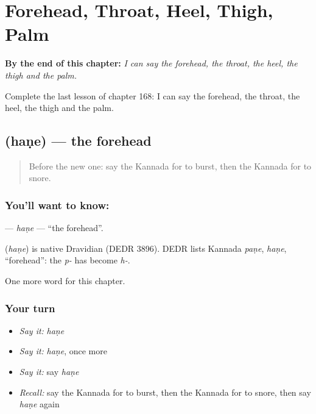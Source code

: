 
\chapter{Forehead, Throat, Heel, Thigh, Palm}
\label{ch:ka-forehead-throat-heel-thigh-palm}

\begin{chapteropening}
\textbf{By the end of this chapter:} \emph{I can say the forehead, the throat, the heel, the thigh and the palm.}

Complete the last lesson of chapter 168: I can say the forehead, the throat, the heel, the thigh and the palm.
\end{chapteropening}

\section[\texorpdfstring{\kn{ಹಣೆ} (haṇe)}{ಹಣೆ (haṇe)}]{ (haṇe) — the forehead}

\label{lesson:KA-C168-hane}



\begin{quote}
Before the new one: say the Kannada for to burst, then the Kannada for to snore.
\end{quote}

\subsection*{You'll want to know: }
\textbf{} — \emph{haṇe} — \textquotedblleft{}the forehead\textquotedblright{}.

\begin{cousinweb}
\textbf{} (\emph{haṇe}) is native Dravidian (DEDR 3896). DEDR lists Kannada \emph{paṇe}, \emph{haṇe}, \textquotedblleft{}forehead\textquotedblright{}: the \emph{p-} has become \emph{h-}.
\end{cousinweb}

\begin{grammarlens}[title={What you've built}]
One more word for this chapter.
\end{grammarlens}

\subsection*{Your turn}
\begin{itemize}
\raggedright
  \item \emph{Say it:} \emph{haṇe}
  \item \emph{Say it:} \emph{haṇe}, once more
  \item \emph{Say it:} say \emph{haṇe}
  \item \emph{Recall:} say the Kannada for to burst, then the Kannada for to snore, then say \emph{haṇe} again
\end{itemize}

